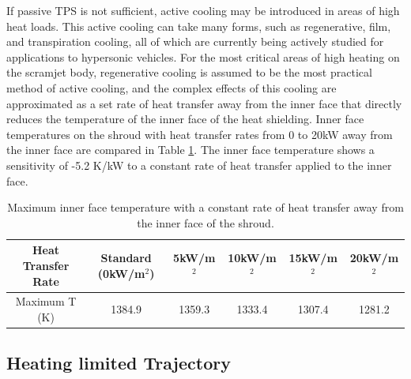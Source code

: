 If passive TPS is not sufficient, active cooling may be introduced in areas of high heat loads. This active cooling can take many forms, such as regenerative, film, and transpiration cooling\cite{Zhu2018}, all of which are currently being actively studied for applications to hypersonic vehicles. For the most critical areas of high heating on the scramjet body, regenerative cooling is assumed to be the most practical method of active cooling, and the complex effects of this cooling are approximated as a set rate of heat transfer away from the inner face that directly reduces the temperature of the inner face of the heat shielding. Inner face temperatures on the shroud with heat transfer rates from 0 to 20kW away from the inner face are compared in Table \ref{tab:regenerativecooling}. The inner face temperature shows a sensitivity of -5.2 K/kW to a constant rate of heat transfer applied to the inner face. 


\begin{table}[ht]
	\centering
	\begin{tabular}{|c|c|c|c|c|c|}
		\hline Heat Transfer Rate & Standard (0kW/m$^2$) & 5kW/m$^2$ & 10kW/m$^2$ & 15kW/m$^2$ & 20kW/m$^2$ \\ 
		\hline Maximum T (K) & 1384.9 & 1359.3 & 1333.4 & 1307.4 & 1281.2 \\ 
		\hline
\end{tabular}	
\caption{Maximum inner face temperature with a constant rate of heat transfer away from the inner face of the shroud.}
\label{tab:regenerativecooling}	
\end{table}



\subsection{Heating limited Trajectory}

